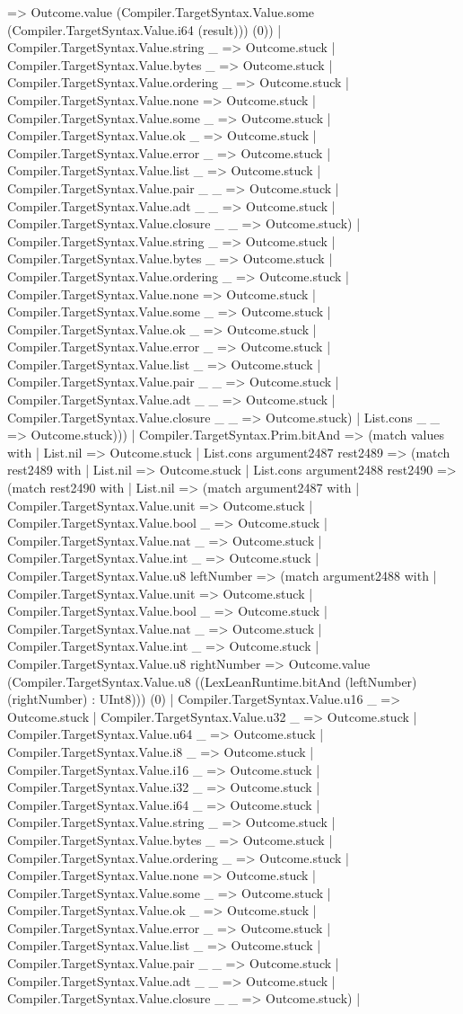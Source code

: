 \documentclass[11pt]{article}
\begin{document}
=> Outcome.value (Compiler.TargetSyntax.Value.some (Compiler.TargetSyntax.Value.i64 (result))) (0)) | Compiler.TargetSyntax.Value.string \_ => Outcome.stuck | Compiler.TargetSyntax.Value.bytes \_ => Outcome.stuck | Compiler.TargetSyntax.Value.ordering \_ => Outcome.stuck | Compiler.TargetSyntax.Value.none => Outcome.stuck | Compiler.TargetSyntax.Value.some \_ => Outcome.stuck | Compiler.TargetSyntax.Value.ok \_ => Outcome.stuck | Compiler.TargetSyntax.Value.error \_ => Outcome.stuck | Compiler.TargetSyntax.Value.list \_ => Outcome.stuck | Compiler.TargetSyntax.Value.pair \_ \_ => Outcome.stuck | Compiler.TargetSyntax.Value.adt \_ \_ => Outcome.stuck | Compiler.TargetSyntax.Value.closure \_ \_ => Outcome.stuck) | Compiler.TargetSyntax.Value.string \_ => Outcome.stuck | Compiler.TargetSyntax.Value.bytes \_ => Outcome.stuck | Compiler.TargetSyntax.Value.ordering \_ => Outcome.stuck | Compiler.TargetSyntax.Value.none => Outcome.stuck | Compiler.TargetSyntax.Value.some \_ => Outcome.stuck | Compiler.TargetSyntax.Value.ok \_ => Outcome.stuck | Compiler.TargetSyntax.Value.error \_ => Outcome.stuck | Compiler.TargetSyntax.Value.list \_ => Outcome.stuck | Compiler.TargetSyntax.Value.pair \_ \_ => Outcome.stuck | Compiler.TargetSyntax.Value.adt \_ \_ => Outcome.stuck | Compiler.TargetSyntax.Value.closure \_ \_ => Outcome.stuck) | List.cons \_ \_ => Outcome.stuck))) | Compiler.TargetSyntax.Prim.bitAnd => (match values with | List.nil => Outcome.stuck | List.cons argument2487 rest2489 => (match rest2489 with | List.nil => Outcome.stuck | List.cons argument2488 rest2490 => (match rest2490 with | List.nil => (match argument2487 with | Compiler.TargetSyntax.Value.unit => Outcome.stuck | Compiler.TargetSyntax.Value.bool \_ => Outcome.stuck | Compiler.TargetSyntax.Value.nat \_ => Outcome.stuck | Compiler.TargetSyntax.Value.int \_ => Outcome.stuck | Compiler.TargetSyntax.Value.u8 leftNumber => (match argument2488 with | Compiler.TargetSyntax.Value.unit => Outcome.stuck | Compiler.TargetSyntax.Value.bool \_ => Outcome.stuck | Compiler.TargetSyntax.Value.nat \_ => Outcome.stuck | Compiler.TargetSyntax.Value.int \_ => Outcome.stuck | Compiler.TargetSyntax.Value.u8 rightNumber => Outcome.value (Compiler.TargetSyntax.Value.u8 ((LexLeanRuntime.bitAnd (leftNumber) (rightNumber) : UInt8))) (0) | Compiler.TargetSyntax.Value.u16 \_ => Outcome.stuck | Compiler.TargetSyntax.Value.u32 \_ => Outcome.stuck | Compiler.TargetSyntax.Value.u64 \_ => Outcome.stuck | Compiler.TargetSyntax.Value.i8 \_ => Outcome.stuck | Compiler.TargetSyntax.Value.i16 \_ => Outcome.stuck | Compiler.TargetSyntax.Value.i32 \_ => Outcome.stuck | Compiler.TargetSyntax.Value.i64 \_ => Outcome.stuck | Compiler.TargetSyntax.Value.string \_ => Outcome.stuck | Compiler.TargetSyntax.Value.bytes \_ => Outcome.stuck | Compiler.TargetSyntax.Value.ordering \_ => Outcome.stuck | Compiler.TargetSyntax.Value.none => Outcome.stuck | Compiler.TargetSyntax.Value.some \_ => Outcome.stuck | Compiler.TargetSyntax.Value.ok \_ => Outcome.stuck | Compiler.TargetSyntax.Value.error \_ => Outcome.stuck | Compiler.TargetSyntax.Value.list \_ => Outcome.stuck | Compiler.TargetSyntax.Value.pair \_ \_ => Outcome.stuck | Compiler.TargetSyntax.Value.adt \_ \_ => Outcome.stuck | Compiler.TargetSyntax.Value.closure \_ \_ => Outcome.stuck) | 
\end{document}
